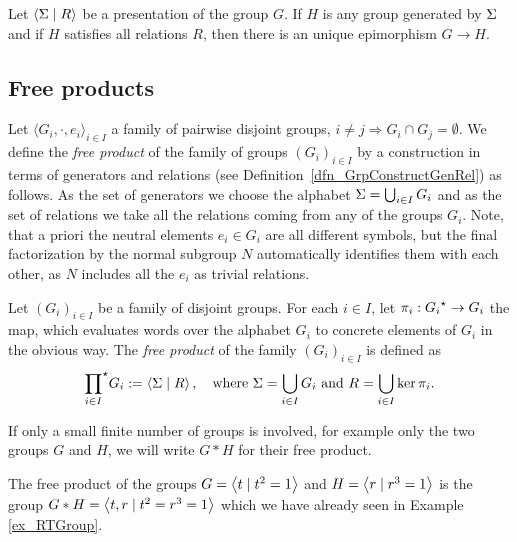 \begin{theorem}
Let $\left\langle \Sigma \mid R \right\rangle$ be a presentation of the group $G$. If $H$ is any group generated by $\Sigma$ and if $H$ satisfies all relations $R$, then there is an unique epimorphism $G \to H$.
\end{theorem}

\subsection{Free products}

Let $\langle G_i, \cdot, e_i \rangle_{i \in I}$ a family of pairwise disjoint groups, \ie $i \ne j \Rightarrow G_i \cap G_j = \emptyset$. We define the \emph{free product} of the family of groups $(G_i)_{i \in I}$ by a construction in terms of generators and relations (see Definition~\ref{dfn_GrpConstructGenRel}) as follows. As the set of generators we choose the alphabet $\Sigma = \bigcup_{i \in I} G_i$ and as the set of relations we take all the relations coming from any of the groups $G_i$. Note, that a priori the neutral elements $e_i \in G_i$ are all different symbols, but the final factorization by the normal subgroup $N$ automatically identifies them with each other, as $N$ includes all the $e_i$ as trivial relations.

\begin{definition}
Let $(G_i)_{i \in I}$ be a family of disjoint groups. For each $i \in I$, let $\pi_i : {G_i}^{\star} \to G_i$ the map, which evaluates words over the alphabet $G_i$ to concrete elements of $G_i$ in the obvious way. The \emph{free product} of the family $(G_i)_{i \in I}$ is defined as
\begin{equation*}
{\prod_{i \in I}}^{\star} G_i := \left\langle \Sigma \mid R \right\rangle, 
\quad \text{where } \Sigma = \bigcup_{i \in I} G_i \text{ and } R = \bigcup_{i \in I} \ker \pi_i.
\end{equation*} 
\end{definition}

If only a small finite number of groups is involved, for example only the two groups $G$ and $H$, we will write $G \ast H$ for their free product.

\begin{example}
\label{ex_RTFreeProd}
The free product of the groups $G = \left\langle t \mid t^2 = 1 \right\rangle$ and $H = \left\langle r \mid r^3 = 1 \right\rangle$ is the group $G \ast H = \left\langle t,r \mid t^2 = r^3 = 1 \right\rangle$ which we have already seen in Example \ref{ex_RTGroup}.
\end{example}

